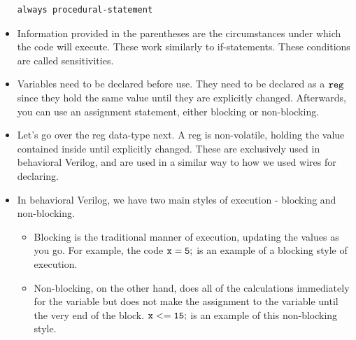 \documentclass[10pt,a4paper]{article}
\begin{document}
\begin{itemize}
\begin{lstlisting}
always procedural-statement
\end{lstlisting}
\item Information provided in the parentheses are the circumstances under which the code will execute. These work similarly to if-statements. These conditions are called sensitivities. 
\item Variables need to be declared before use. They need to be declared as a $\tt{reg}$ since they hold the same value until they are explicitly changed. Afterwards, you can use an assignment statement, either blocking or non-blocking. 
\item Let's go over the reg data-type next. A reg is non-volatile, holding the value contained inside until explicitly changed. These are exclusively used in behavioral Verilog, and are used in a similar way to how we used wires for declaring.
\item In behavioral Verilog, we have two main styles of execution - blocking and non-blocking.
\begin{itemize}
\item Blocking is the traditional manner of execution, updating the values as you go. For example, the code $\tt{x=5;}$ is an example of a blocking style of execution.
\item Non-blocking, on the other hand, does all of the calculations immediately for the variable but does not make the assignment to the variable until the very end of the block. $\tt{x<=15;}$ is an example of this non-blocking style.
\end{itemize}	
\end{itemize}
\end{document}
